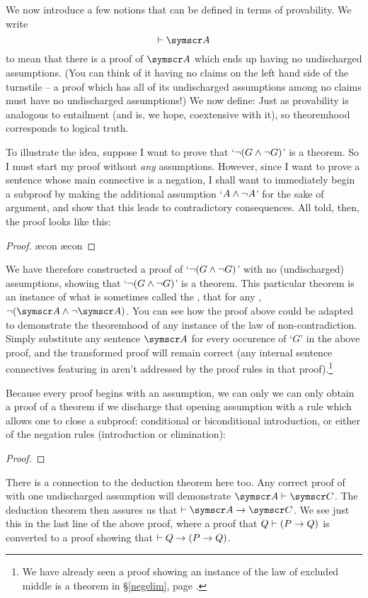 We now introduce a few notions that can be defined in terms of provability. We write
$$\proves \meta{A}$$
to mean that there is a proof of $\meta{A}$ which ends up having no undischarged assumptions. (You can think of it having no claims on the left hand side of the turnstile – a proof which has all of its undischarged assumptions among no claims must have no undischarged assumptions!) We now define:
Just as provability is analogous to entailment (and is, we hope, coextensive with it), so theoremhood corresponds to logical truth. 

To illustrate the idea, suppose I want to prove that `$\neg (G \wedge \neg G)$' is a theorem. So I must start my proof without \emph{any} assumptions. However, since I want to prove a sentence whose main connective is a negation, I shall want to  immediately begin a subproof by making the additional assumption `$A \wedge \neg A$' for the sake of argument, and show that this leads to contradictory consequences. All told, then, the proof looks like this:
	\begin{proof}
		\open
			\ae{con}
			\ae{con}
		\close
	\end{proof}
We have therefore constructed a proof of `$\neg (G \wedge \neg G)$' with no (undischarged) assumptions, showing that `$\neg (G \wedge \neg G)$' is a theorem. This particular theorem is an instance of what is sometimes called the , that for any , $\enot(\meta{A}\eand\enot\meta{A})$. You can see how the proof above could be adapted to demonstrate the theoremhood of any instance of the law of non-contradiction. Simply substitute any sentence $\meta{A}$ for every occurence of `$G$' in the above proof, and the transformed proof will remain correct (any internal sentence connectives featuring in  aren't addressed by the proof rules in that proof).\footnote{We have already seen a proof showing an instance of the law of excluded middle is a theorem in §\ref{negelim}, page \pageref{excmidd}.}

Because every proof begins with an assumption, we can only we can only obtain a proof of a theorem if we discharge that opening assumption with a rule which allows one to close a subproof: conditional or biconditional introduction, or either of the negation rules (introduction or elimination): 
  \begin{proof}
    \open
    \open
    \open
    \close
    \close
    \close
  \end{proof}
There is a connection to the deduction theorem here too. Any correct proof of  with one undischarged assumption  will demonstrate $\meta{A}\proves\meta{C}$. The deduction theorem then assures us that $\proves \meta{A}\eif\meta{C}$. We see just this in the last line of the above proof, where a proof that $Q \vdash (P \rightarrow Q)$ is converted to a proof showing that $\vdash Q \rightarrow (P \rightarrow Q)$.

